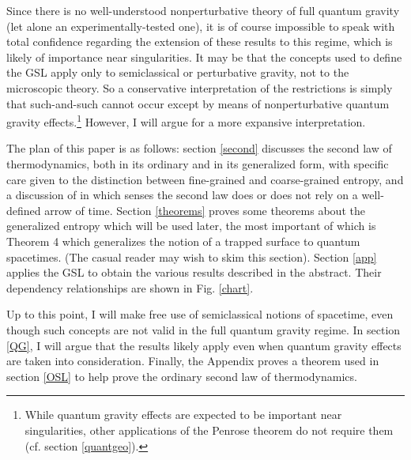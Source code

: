 \documentclass{article}
\begin{document}
Since there is no well-understood nonperturbative theory of full quantum gravity (let alone an experimentally-tested one), it is of course impossible to speak with total confidence regarding the extension of these results to this regime, which is likely of importance near singularities.  It may be that the concepts used to define the GSL apply only to semiclassical or perturbative gravity, not to the microscopic theory.  So a conservative interpretation of the restrictions is simply that such-and-such cannot occur except by means of nonperturbative quantum gravity effects.\footnote{While quantum gravity effects are expected to be important near singularities, other applications of the Penrose theorem do not require them (cf. section \ref{quantgeo}).} However, I will argue for a more expansive interpretation.

The plan of this paper is as follows: section \ref{second} discusses the second law of thermodynamics, both in its ordinary and in its generalized form, with specific care given to the distinction between fine-grained and coarse-grained entropy, and a discussion of in which senses the second law does or does not rely on a well-defined arrow of time.  Section \ref{theorems} proves some theorems about the generalized entropy which will be used later, the most important of which is Theorem 4 which generalizes the notion of a trapped surface to quantum spacetimes.  (The casual reader may wish to skim this section).  Section \ref{app} applies the GSL to obtain the various results described in the abstract.  
Their dependency relationships are shown in Fig. \ref{chart}.

Up to this point, I will make free use of semiclassical notions of spacetime, even though such concepts are not valid in the full quantum gravity regime.  In section \ref{QG}, I will argue that the results likely apply even when quantum gravity effects are taken into consideration.  Finally, the Appendix proves a theorem used in section \ref{OSL} to help prove the ordinary second law of thermodynamics.
\end{document}
